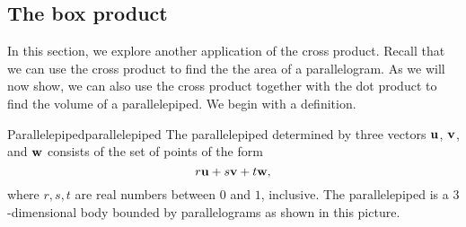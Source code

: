 \subsection{The box product}

In this section, we explore another application of the cross product.
Recall that we can use the cross product to find the the area of a
parallelogram. As we will now show, we can also use the cross product
together with the dot product to find the volume of a
parallelepiped. We begin with a definition.

\begin{definition}{Parallelepiped}{parallelepiped}
  The parallelepiped determined by three
  vectors $\vect{u}$, $\vect{v}$, and $\vect{w}$ consists of the set of
  points of the form
  \begin{equation*}
    r\/\vect{u}+s\/\vect{v}+t\/\vect{w},
  \end{equation*}
  where $r,s,t$ are real numbers between $0$ and $1$, inclusive. The
  parallelepiped is a $3$-dimensional body bounded by parallelograms
  as shown in this picture.
  \begin{center}
  \end{center}
\end{definition}

